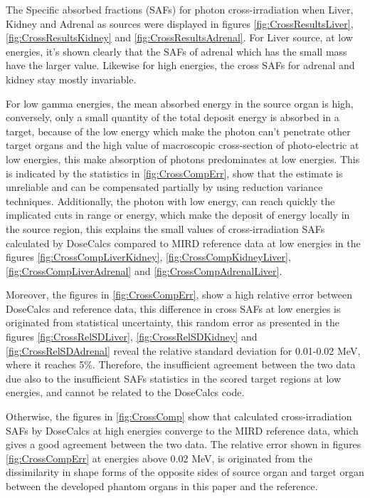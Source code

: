 \documentclass[letterpaper,12pt]{article}
\begin{document}
The Specific absorbed fractions (SAFs) for photon cross-irradiation when Liver, Kidney and Adrenal as sources were displayed in figures \ref{fig:CrossResultsLiver}, \ref{fig:CrossResultsKidney} and \ref{fig:CrossResultsAdrenal}. For Liver source, at low energies, it's shown clearly that the SAFs of adrenal which has the small mass have the larger value. Likewise for high energies, the cross SAFs for adrenal and kidney stay mostly invariable.

For low gamma energies, the mean absorbed energy in the source organ is high, conversely, only a small quantity of the total deposit energy is absorbed in a target, because of the low energy which make the photon can't penetrate other target organs and the high value of macroscopic cross-section of photo-electric at low energies, this make absorption of photons predominates at low energies. This is indicated by the statistics in \ref{fig:CrossCompErr}, show that the estimate is unreliable and can be compensated partially by using reduction variance techniques. Additionally, the photon with low energy, can reach quickly the implicated cuts in range or energy, which make the deposit of energy locally in the source region, this explains the small values of cross-irradiation SAFs calculated by DoseCalcs compared to MIRD reference data at low energies in the figures \ref{fig:CrossCompLiverKidney}, \ref{fig:CrossCompKidneyLiver}, \ref{fig:CrossCompLiverAdrenal} and \ref{fig:CrossCompAdrenalLiver}.

Moreover, the figures in \ref{fig:CrossCompErr}, show a high relative error between DoseCalcs and reference data, this difference in cross SAFs at low energies is originated from statistical uncertainty, this random error as presented in the figures \ref{fig:CrossRelSDLiver}, \ref{fig:CrossRelSDKidney} and \ref{fig:CrossRelSDAdrenal} reveal the relative standard deviation for 0.01-0.02 MeV, where it reaches 5\%. Therefore, the insufficient agreement between the two data due also to the insufficient SAFs statistics in the scored target regions at low energies, and cannot be related to the DoseCalcs code.

Otherwise, the figures in \ref{fig:CrossComp} show that calculated cross-irradiation SAFs by DoseCalcs at high energies converge to the MIRD reference data, which gives a good agreement between the two data. The relative error shown in figures \ref{fig:CrossCompErr} at energies above 0.02 MeV, is originated from the dissimilarity in shape forms of the opposite sides of source organ and target organ between the developed phantom organs in this paper and the reference.
\end{document}
